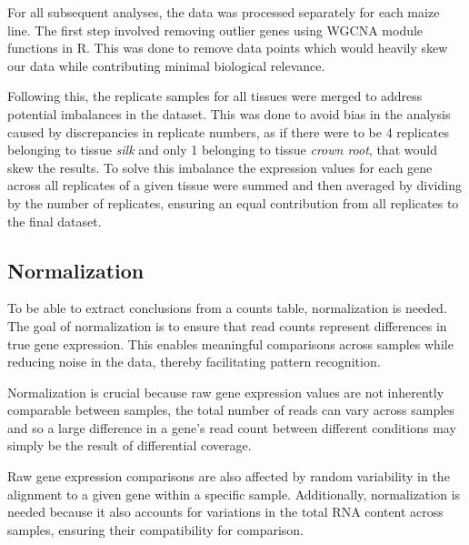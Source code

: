 \documentclass[
]{article}
\begin{document}
For all subsequent analyses, the data was processed separately for each
maize line. The first step involved removing outlier genes using WGCNA
module functions in R. This was done to remove data points which would
heavily skew our data while contributing minimal biological relevance.

Following this, the replicate samples for all tissues were merged to
address potential imbalances in the dataset. This was done to avoid bias
in the analysis caused by discrepancies in replicate numbers, as if
there were to be 4 replicates belonging to tissue \emph{silk} and only 1
belonging to tissue \emph{crown root}, that would skew the results. To
solve this imbalance the expression values for each gene across all
replicates of a given tissue were summed and then averaged by dividing
by the number of replicates, ensuring an equal contribution from all
replicates to the final dataset.

\hypertarget{normalization}{%
\subsection{Normalization}\label{normalization}}

To be able to extract conclusions from a counts table, normalization is
needed. The goal of normalization is to ensure that read counts
represent differences in true gene expression. This enables meaningful
comparisons across samples while reducing noise in the data, thereby
facilitating pattern recognition.

Normalization is crucial because raw gene expression values are not
inherently comparable between samples, the total number of reads can
vary across samples and so a large difference in a gene's read count
between different conditions may simply be the result of differential
coverage.

Raw gene expression comparisons are also affected by random variability
in the alignment to a given gene within a specific sample. Additionally,
normalization is needed because it also accounts for variations in the
total RNA content across samples, ensuring their compatibility for
comparison.
\end{document}
